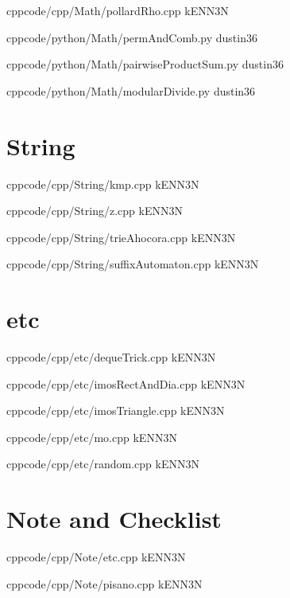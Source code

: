 \documentclass[landscape, 8pt, a4paper, twocolumn]{extarticle} %
\begin{document}
{}{}
{cpp}{code/cpp/Math/pollardRho.cpp}
{kENN3N}

{}{}
{cpp}{code/python/Math/permAndComb.py}
{dustin36}

{}{}
{cpp}{code/python/Math/pairwiseProductSum.py}
{dustin36}

{}{}
{cpp}{code/python/Math/modularDivide.py}
{dustin36}

\pagebreak
\section{String}

{}{}
{cpp}{code/cpp/String/kmp.cpp}
{kENN3N}

{}{}
{cpp}{code/cpp/String/z.cpp}
{kENN3N}

{}{}
{cpp}{code/cpp/String/trieAhocora.cpp}
{kENN3N}

{}{}
{cpp}{code/cpp/String/suffixAutomaton.cpp}
{kENN3N}

\pagebreak
\section{etc}

{}{}
{cpp}{code/cpp/etc/dequeTrick.cpp}
{kENN3N}

{}{}
{cpp}{code/cpp/etc/imosRectAndDia.cpp}
{kENN3N}

{}{}
{cpp}{code/cpp/etc/imosTriangle.cpp}
{kENN3N}

{}{}
{cpp}{code/cpp/etc/mo.cpp}
{kENN3N}

{}{}
{cpp}{code/cpp/etc/random.cpp}
{kENN3N}


\pagebreak
\section{Note and Checklist}

{}{}
{cpp}{code/cpp/Note/etc.cpp}
{kENN3N}

{}{}
{cpp}{code/cpp/Note/pisano.cpp}
{kENN3N}
\end{document}
